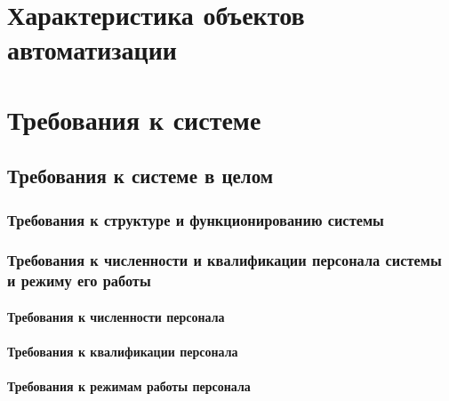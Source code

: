 \documentclass[a4paper, 12pt]{article}		%
\begin{document}
\newpage
\section{Характеристика объектов автоматизации}


\newpage
\section{Требования к системе}
\subsection{Требования к системе в целом}
\subsubsection{Требования к структуре и функционированию системы}


\subsubsection{Требования к численности и квалификации персонала системы и режиму его работы}

\paragraph{Требования к численности персонала}


\paragraph{Требования к квалификации персонала}


\paragraph{Требования к режимам работы персонала}
\end{document}
